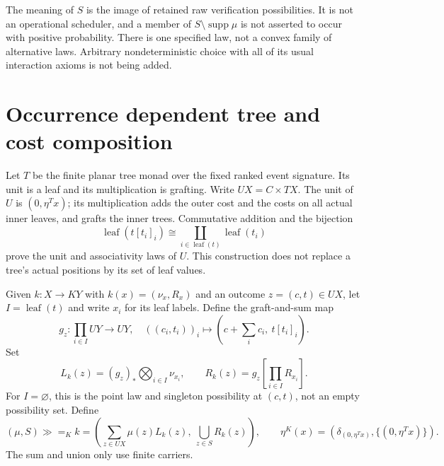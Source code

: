 \documentclass[11pt,a4paper]{article}
\theoremstyle{definition}
\newcommand{\supp}{\operatorname{supp}}
\newcommand{\leaf}{\operatorname{leaf}}
\begin{document}
The meaning of $S$ is the image of retained raw verification possibilities.
It is not an operational scheduler, and a member of $S\setminus\supp\mu$
is not asserted to occur with positive probability. There is one specified
law, not a convex family of alternative laws. Arbitrary nondeterministic
choice with all of its usual interaction axioms is not being added.

\section{Occurrence dependent tree and cost composition}\label{sec:K}
Let $T$ be the finite planar tree monad over the fixed ranked event
signature. Its unit is a leaf and its multiplication is grafting. Write
$UX=C\times TX$. The unit of $U$ is $(0,\eta^T x)$; its multiplication
adds the outer cost and the costs on all actual inner leaves, and grafts
the inner trees. Commutative addition and the bijection
\[
 \leaf(t[t_i]_i)\cong\coprod_{i\in\leaf(t)}\leaf(t_i)
\]
prove the unit and associativity laws of $U$. This construction does not
replace a tree's actual positions by its set of leaf values.

Given $k:X\to KY$ with $k(x)=(\nu_x,R_x)$ and an outcome
$z=(c,t)\in UX$, let $I=\leaf(t)$ and write $x_i$ for its leaf labels.
Define the graft-and-sum map
\begin{equation}\label{eq:graft-map}
 g_z:\prod_{i\in I}UY\longrightarrow UY,
 \quad ((c_i,t_i))_i\longmapsto
          \left(c+\sum_i c_i,\ t[t_i]_i\right).
\end{equation}
Set
\[
 L_k(z)=(g_z)_*\bigotimes_{i\in I}\nu_{x_i},\qquad
 R_k(z)=g_z\left[\prod_{i\in I}R_{x_i}\right].
\]
For $I=\varnothing$, this is the point law and singleton possibility at
$(c,t)$, not an empty possibility set. Define
\begin{equation}\label{eq:K-bind}
 (\mu,S)\mathbin{\gg=_K}k
   =\left(\sum_{z\in UX}\mu(z)L_k(z),\
               \bigcup_{z\in S}R_k(z)\right),
 \qquad \eta^K(x)=(\delta_{(0,\eta^T x)},\{(0,\eta^T x)\}).
\end{equation}
The sum and union only use finite carriers.
\end{document}
